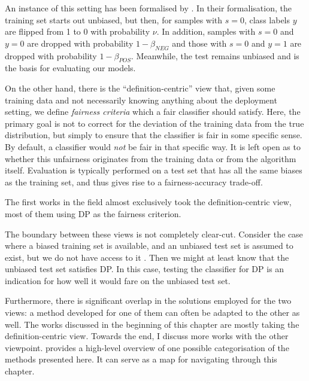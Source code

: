 An instance of this setting has been formalised by \citet{blum2020recovering}. In their
formalisation, the training set starts out unbiased, but then, for samples with \(s=0\), class
labels \(y\) are flipped from 1 to 0 with probability \(\nu\). In addition, samples with \(s=0\)
and \(y=0\) are dropped with probability \(1-\beta_\mathit{NEG}\) and those with \(s=0\) and
\(y=1\) are dropped with probability \(1-\beta_\mathit{POS}\). Meanwhile, the test remains unbiased
and is the basis for evaluating our models.

On the other hand, there is the ``definition-centric'' view that, given some training data and not
necessarily knowing anything about the deployment setting, we define \emph{fairness criteria} which
a fair classifier should satisfy. Here, the primary goal is not to correct for the deviation of the
training data from the true distribution, but simply to ensure that the classifier is fair in some
specific sense. By default, a classifier would \emph{not} be fair in that specific way. It is left
open as to whether this unfairness originates from the training data or from the algorithm itself.
Evaluation is typically performed on a test set that has all the same biases as the training set,
and thus gives rise to a fairness-accuracy trade-off.

The first works in the field almost exclusively took the definition-centric view, most of them
using \acf{DP} \citep{dwork2012fairness} as the fairness criterion.

The boundary between these views is not completely clear-cut. Consider the case where a biased
training set is available, and an unbiased test set is assumed to exist, but we do not have access
to it \citep{jiang2020identifying}. Then we might at least know that the unbiased test set
satisfies \ac{DP}. In this case, testing the classifier for \ac{DP} is an indication for how well
it would fare on the unbiased test set.

Furthermore, there is significant overlap in the solutions employed for the two views: a method
developed for one of them can often be adapted to the other as well. The works discussed in the
beginning of this chapter are mostly taking the definition-centric view. Towards the end, I discuss
more works with the other viewpoint.  provides a high-level overview
of one possible categorisation of the methods presented here. It can serve as a map for navigating
through this chapter.

